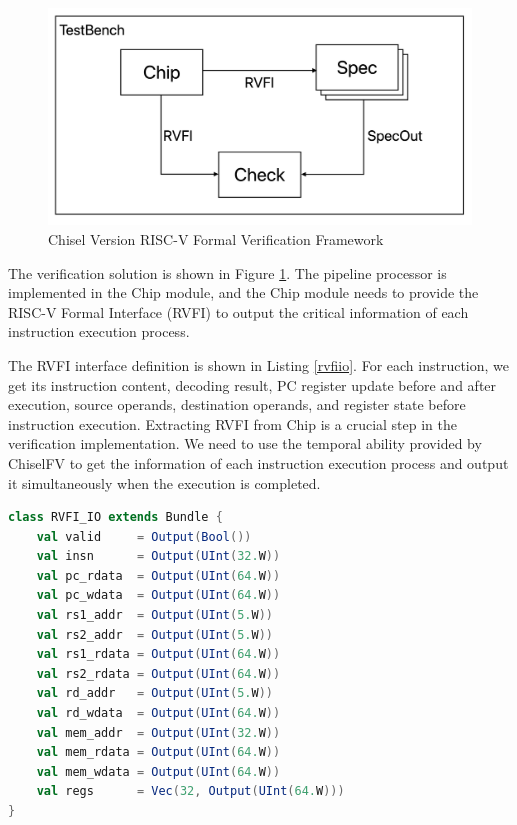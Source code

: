 \documentclass[conference]{IEEEtran}
\theoremstyle{definition}
\begin{document}
\begin{figure}[!htbp]
    \begin{center}
    \includegraphics[width=1\linewidth]{pics/riscvFvChisel.png}
    \caption{Chisel Version RISC-V Formal Verification Framework}
    \label{fig: riscvFv}
    \end{center}
\end{figure}

The verification solution is shown in Figure \ref{fig: riscvFv}. The pipeline processor is implemented in the Chip module, and the Chip module needs to provide the RISC-V Formal Interface (RVFI) to output the critical information of each instruction execution process. 

The RVFI interface definition is shown in Listing \ref{rvfiio}.
For each instruction, we get its instruction content, decoding result, PC register update before and after execution, source operands, destination operands, and register state before instruction execution.
Extracting RVFI from Chip is a crucial step in the verification implementation. We need to use the temporal ability provided by ChiselFV to get the information of each instruction execution process and output it simultaneously when the execution is completed.

\begin{lstlisting}[language=scala, caption={RVFI Definition}, label=rvfiio]
class RVFI_IO extends Bundle {
    val valid     = Output(Bool())
    val insn      = Output(UInt(32.W))
    val pc_rdata  = Output(UInt(64.W))
    val pc_wdata  = Output(UInt(64.W))
    val rs1_addr  = Output(UInt(5.W))
    val rs2_addr  = Output(UInt(5.W))
    val rs1_rdata = Output(UInt(64.W))
    val rs2_rdata = Output(UInt(64.W))
    val rd_addr   = Output(UInt(5.W))
    val rd_wdata  = Output(UInt(64.W))
    val mem_addr  = Output(UInt(32.W))
    val mem_rdata = Output(UInt(64.W))
    val mem_wdata = Output(UInt(64.W))
    val regs      = Vec(32, Output(UInt(64.W)))
}
\end{lstlisting}
\end{document}
